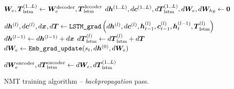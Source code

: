 \begin{algorithm}
$\bm{W}_{e}, \mbox{\boldmath{$T$}}_{\text{lstm}}^{(1..L)} \leftarrow \bm{W}_{e}^{\text{decoder}},
\mbox{\boldmath{$T$}}_{\text{lstm}}^{\text{decoder}}$ 
$d\bm{h}_{}^{(1..L)}, d\bm{c}_{}^{(1..L)}, d\mbox{\boldmath{$T$}}_{\text{lstm}}^{(1..L)}, d\bm{W}_{e}, d\bm{W}_{hy}
\leftarrow \bm{0}$  %

 {



 {
  $d\bm{h}_{}^{(l)}, d\bm{c}_{}^{(l)}, d\bm{x}_{}, d\bm{T} \leftarrow 
  \text{\texttt{LSTM\_grad}}\left(d\bm{h}_{}^{(l)}, d\bm{c}_{}^{(l)}, \bm{h}_{t-1}^{(l)},
  \bm{c}_{t-1}^{(l)}, \bm{h}_{t}^{(l-1)}, \mbox{\boldmath{$T$}}_{\text{lstm}}^{(l)}\right)$ \;
  $d\bm{h}_{}^{(l-1)} \leftarrow d\bm{h}_{}^{(l-1)} + d\bm{x}_{}$\;
  $d\mbox{\boldmath{$T$}}_{\text{lstm}}^{(l)} \leftarrow d\mbox{\boldmath{$T$}}_{\text{lstm}}^{(l)} + d\bm{T}$\;
}
$d\bm{W}_{e} \leftarrow \text{\texttt{Emb\_grad\_update}}(s_t, d\bm{h}_{}^{(0)}, d\bm{W}_{e})$ \;

}
$d\bm{W}_{e}^{\text{encoder}}, d\mbox{\boldmath{$T$}}_{\text{lstm}}^{\text{encoder}} \leftarrow d\bm{W}_{e},
d\mbox{\boldmath{$T$}}_{\text{lstm}}^{(1..L)}$ 

\caption{NMT training algorithm -- {\it backpropagation} pass.}
\label{a:nmt_backward}
\end{algorithm}


